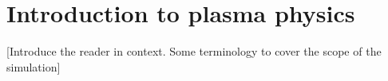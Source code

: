 \chapter{Introduction to plasma physics}

[Introduce the reader in context. Some terminology to cover the scope of the
simulation]


